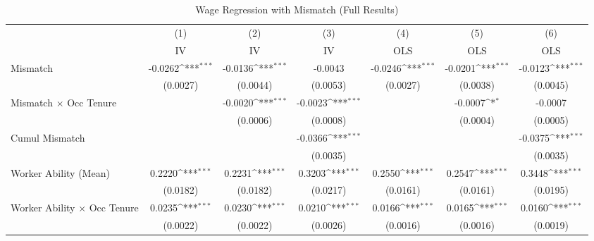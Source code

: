 {
\def\sym#1{\ifmmode^{#1}\else\(^{#1}\)\fi}
\begin{longtable}{l*{6}{c}}
\caption{Wage Regression with Mismatch (Full Results)}\\
\hline  \endfirsthead\hline  \endhead\hline  \endfoot\endlastfoot
                    &\multicolumn{1}{c}{(1)}&\multicolumn{1}{c}{(2)}&\multicolumn{1}{c}{(3)}&\multicolumn{1}{c}{(4)}&\multicolumn{1}{c}{(5)}&\multicolumn{1}{c}{(6)}\\
                    &\multicolumn{1}{c}{IV}&\multicolumn{1}{c}{IV}&\multicolumn{1}{c}{IV}&\multicolumn{1}{c}{OLS}&\multicolumn{1}{c}{OLS}&\multicolumn{1}{c}{OLS}\\
\hline  
Mismatch            &     -0.0262\sym{***}&     -0.0136\sym{***}&     -0.0043         &     -0.0246\sym{***}&     -0.0201\sym{***}&     -0.0123\sym{***}\\
                    &    (0.0027)         &    (0.0044)         &    (0.0053)         &    (0.0027)         &    (0.0038)         &    (0.0045)         \\
Mismatch $\times$ Occ Tenure&                     &     -0.0020\sym{***}&     -0.0023\sym{***}&                     &     -0.0007\sym{*}  &     -0.0007         \\
                    &                     &    (0.0006)         &    (0.0008)         &                     &    (0.0004)         &    (0.0005)         \\
Cumul Mismatch      &                     &                     &     -0.0366\sym{***}&                     &                     &     -0.0375\sym{***}\\
                    &                     &                     &    (0.0035)         &                     &                     &    (0.0035)         \\
Worker Ability (Mean)&      0.2220\sym{***}&      0.2231\sym{***}&      0.3203\sym{***}&      0.2550\sym{***}&      0.2547\sym{***}&      0.3448\sym{***}\\
                    &    (0.0182)         &    (0.0182)         &    (0.0217)         &    (0.0161)         &    (0.0161)         &    (0.0195)         \\
Worker Ability $\times$ Occ Tenure&      0.0235\sym{***}&      0.0230\sym{***}&      0.0210\sym{***}&      0.0166\sym{***}&      0.0165\sym{***}&      0.0160\sym{***}\\
                    &    (0.0022)         &    (0.0022)         &    (0.0026)         &    (0.0016)         &    (0.0016)         &    (0.0019)         \\

\end{longtable}}
